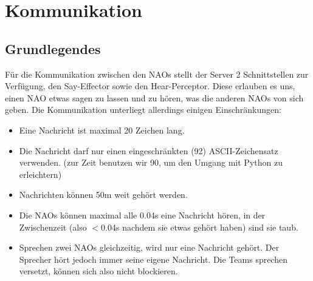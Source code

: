 \section*{Kommunikation}
\subsection*{Grundlegendes}
Für die Kommunikation zwischen den NAOs stellt der Server 2 
Schnittstellen zur Verfügung, den Say-Effector sowie den Hear-Perceptor.
 Diese erlauben es uns, einen NAO etwas sagen zu lassen und zu hören, 
was die anderen NAOs von sich geben. Die Kommunikation unterliegt 
allerdings einigen Einschränkungen:

\begin{itemize}
\item  Eine Nachricht ist maximal 20 Zeichen lang.
\item  Die Nachricht darf nur einen eingeschränkten (92) 
ASCII-Zeichensatz verwenden. (zur Zeit benutzen wir 90, um den Umgang 
mit Python zu erleichtern)
\item  Nachrichten können 50m weit gehört werden.
\item  Die NAOs können maximal alle 0.04s eine Nachricht hören, in 
der Zwischenzeit (also $<$0.04s nachdem sie etwas gehört haben) sind 
sie taub.
\item  Sprechen zwei NAOs gleichzeitig, wird nur eine Nachricht 
gehört. Der Sprecher hört jedoch immer seine eigene Nachricht. Die Teams
 sprechen versetzt, können sich also nicht blockieren.
\end{itemize}

